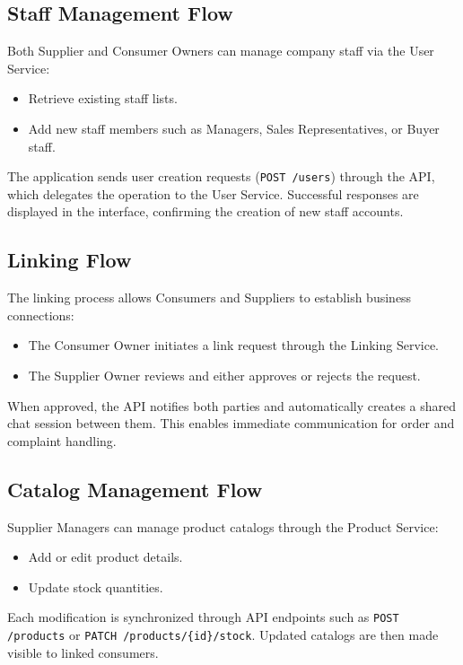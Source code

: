 \subsection{Staff Management Flow}

Both Supplier and Consumer Owners can manage company staff via the User Service:
\begin{itemize}
    \item Retrieve existing staff lists.
    \item Add new staff members such as Managers, Sales Representatives, or Buyer staff.
\end{itemize}
The application sends user creation requests (\texttt{POST /users}) through the API, which delegates the operation to the User Service. Successful responses are displayed in the interface, confirming the creation of new staff accounts.

\subsection{Linking Flow}

The linking process allows Consumers and Suppliers to establish business connections:
\begin{itemize}
    \item The Consumer Owner initiates a link request through the Linking Service.
    \item The Supplier Owner reviews and either approves or rejects the request.
\end{itemize}
When approved, the API notifies both parties and automatically creates a shared chat session between them. This enables immediate communication for order and complaint handling.

\subsection{Catalog Management Flow}

Supplier Managers can manage product catalogs through the Product Service:
\begin{itemize}
    \item Add or edit product details.
    \item Update stock quantities.
\end{itemize}
Each modification is synchronized through API endpoints such as \texttt{POST /products} or \texttt{PATCH /products/\{id\}/stock}. Updated catalogs are then made visible to linked consumers.

